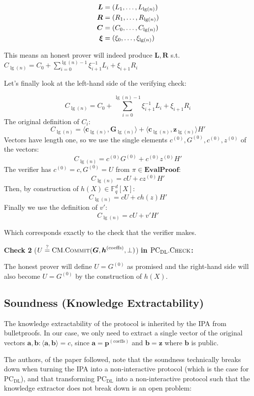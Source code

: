 \documentclass[
]{article}
\newcommand*\Fb{\mathbb{F}}
\newcommand*\meq{\stackrel{?}{=}}
\renewcommand{\vec}[1]{ \boldsymbol{#1} }
\newcommand{\ip}[2]{ \langle #1, #2 \rangle }
\newcommand*{\Commit}{\mathrm{\text{C{\scriptsize OMMIT}}}}
\newcommand*{\PCDL}{\text{PC}_{\text{DL}}}
\newcommand*{\PCDLCheck}{\PCDL.\mathrm{\text{C\scriptsize HECK}}}
\newcommand*{\CM}{\mathrm{\text{CM}}}
\newcommand*{\CMCommit}{\CM.\Commit}
\newcommand*\EvalProof{\mathbf{EvalProof}}
\begin{document}
\[
\begin{alignedat}[b]{1}
  \vec{L}    &= (L_1, \dots, L_{\lg(n)}) \\
  \vec{R}    &= (R_1, \dots, R_{\lg(n)}) \\
  \vec{C}    &= (C_0, \dots, C_{\lg(n)}) \\
  \vec{\xi}  &= (\xi_0, \dots, \xi_{\lg(n)}) \\
\end{alignedat}
\]

This means an honest prover will indeed produce \(\vec{L}, \vec{R}\)
s.t.
\(C_{\lg(n)} = C_0 + \sum^{\lg(n)-1}_{i=0} \xi^{-1}_{i+1} L_i + \xi_{i+1} R_i\)

Let's finally look at the left-hand side of the verifying check:

\[C_{\lg(n)} = C_0 + \sum^{\lg(n)-1}_{i=0} \xi^{-1}_{i+1} L_i + \xi_{i+1} R_i\]
The original definition of \(C_i\):
\[C_{\lg(n)} = \ip{\vec{c}_{\lg(n)}}{\vec{G}_{\lg(n)}} + \ip{\vec{c}_{\lg(n)}}{\vec{z}_{\lg(n)}} H'\]
Vectors have length one, so we use the single elements
\(c^{(0)}, G^{(0)}, c^{(0)}, z^{(0)}\) of the vectors:
\[C_{\lg(n)} = c^{(0)}G^{(0)} + c^{(0)}z^{(0)} H'\] The verifier has
\(c^{(0)} = c, G^{(0)} = U\) from \(\pi \in \EvalProof\):
\[C_{\lg(n)} = cU + cz^{(0)} H'\] Then, by construction of
\(h(X) \in \Fb^d_q[X]\): \[C_{\lg(n)} = cU + ch(z) H'\] Finally we use
the definition of \(v'\): \[C_{\lg(n)} = cU + v'H'\]

Which corresponds exactly to the check that the verifier makes.

\textbf{Check 2}
(\(U \meq \CMCommit(\vec{G}, \vec{h}^{\text{(coeffs)}}, \bot)\))
\textbf{in \(\PCDLCheck\):}

The honest prover will define \(U = G^{(0)}\) as promised and the
right-hand side will also become \(U = G^{(0)}\) by the construction of
\(h(X)\).

\subsection{Soundness (Knowledge
Extractability)}\label{soundness-knowledge-extractability}

The knowledge extractability of the protocol is inherited by the IPA
from bulletproofs. In our case, we only need to extract a single vector
of the original vectors
\(\vec{a}, \vec{b} : \ip{\vec{a}}{\vec{b}} = c\), since
\(\vec{a} = \vec{p}^{\mathrm{(coeffs)}}\) and \(\vec{b} = \vec{z}\)
where \(\vec{b}\) is public.

The authors, of the paper followed, note that the soundness technically
breaks down when turning the IPA into a non-interactive protocol (which
is the case for \(\PCDL\)), and that transforming \(\PCDL\) into a
non-interactive protocol such that the knowledge extractor does not
break down is an open problem:
\end{document}
